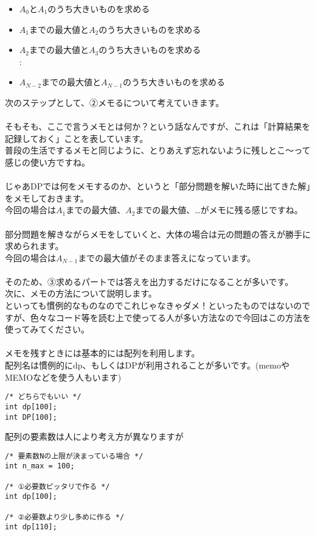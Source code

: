 \begin{itemize}
    \item $A_0$と$A_1$のうち大きいものを求める
    \item $A_1$までの最大値と$A_2$のうち大きいものを求める
    \item $A_2$までの最大値と$A_3$のうち大きいものを求める \\:
    \item $A_{N-2}$までの最大値と$A_{N-1}$のうち大きいものを求める
\end{itemize}
\noindent
次のステップとして、②メモるについて考えていきます。
\\ \\
\noindent
そもそも、ここで言うメモとは何か？という話なんですが、これは「計算結果を記録しておく」ことを表しています。 \\ 
普段の生活でするメモと同じように、とりあえず忘れないように残しとこ～って感じの使い方ですね。
\\ \\
\noindent
じゃあDPでは何をメモするのか、というと「部分問題を解いた時に出てきた解」をメモしておきます。\\
今回の場合は$A_1$までの最大値、$A_2$までの最大値、…がメモに残る感じですね。
\\ \\ \noindent
部分問題を解きながらメモをしていくと、大体の場合は元の問題の答えが勝手に求められます。\\
今回の場合は$A_{N-1}$までの最大値がそのまま答えになっています。
\\ \\ \noindent
そのため、③求めるパートでは答えを出力するだけになることが多いです。\\
\clearpage
\noindent
次に、メモの方法について説明します。\\
といっても慣例的なものなのでこれじゃなきゃダメ！といったものではないのですが、色々なコード等を読む上で使ってる人が多い方法なので今回はこの方法を使ってみてください。
\\ \\ \noindent
メモを残すときには基本的には配列を利用します。\\
配列名は慣例的にdp、もしくはDPが利用されることが多いです。(memoやMEMOなどを使う人もいます)

\begin{lstlisting}[style = customC]
/* どちらでもいい */
int dp[100];
int DP[100];
\end{lstlisting}

配列の要素数は人により考え方が異なりますが
\begin{lstlisting}[style = customJava]
/* 要素数Nの上限が決まっている場合 */
int n_max = 100;

/* ①必要数ピッタリで作る */
int dp[100];

/* ②必要数より少し多めに作る */
int dp[110];
\end{lstlisting}


